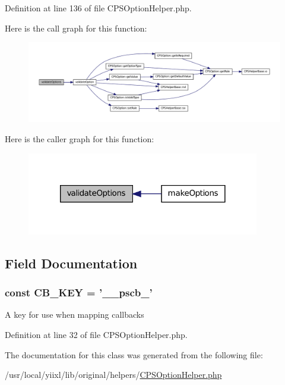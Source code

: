 Definition at line 136 of file CPSOptionHelper.php.








Here is the call graph for this function:\nopagebreak
\begin{figure}[H]
\begin{center}
\leavevmode
\includegraphics[width=400pt]{classCPSOptionHelper_a1196dfb53b5a9c5b1865efd2678c0bb5_cgraph}
\end{center}
\end{figure}




Here is the caller graph for this function:\nopagebreak
\begin{figure}[H]
\begin{center}
\leavevmode
\includegraphics[width=288pt]{classCPSOptionHelper_a1196dfb53b5a9c5b1865efd2678c0bb5_icgraph}
\end{center}
\end{figure}




\subsection{Field Documentation}
\hypertarget{classCPSOptionHelper_a4652b705dc90fe7d967eecbf10901364}{
\subsubsection[{CB\_\-KEY}]{\setlength{\rightskip}{0pt plus 5cm}const {\bf CB\_\-KEY} = '\_\-\_\-pscb\_\-'}}
\label{classCPSOptionHelper_a4652b705dc90fe7d967eecbf10901364}
A key for use when mapping callbacks 

Definition at line 32 of file CPSOptionHelper.php.



The documentation for this class was generated from the following file:\begin{DoxyCompactItemize}
\item 
/usr/local/yiixl/lib/original/helpers/\hyperlink{CPSOptionHelper_8php}{CPSOptionHelper.php}\end{DoxyCompactItemize}

